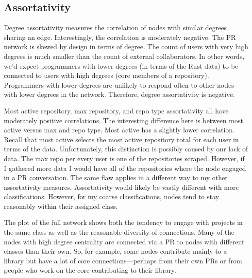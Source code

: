 \documentclass[12pt, a4paper]{article}
\begin{document}
\subsection{Assortativity}
Degree assortativity measures the correlation of nodes with similar degrees sharing an edge. Interestingly, the correlation is moderately negative. The PR network is skewed by design in terms of degree. The count of users with very high degrees is much smaller than the count of external collaborators. In other words, we'd expect programmers with lower degrees (in terms of the Rust data) to be connected to users with high degrees (core members of a repository). Programmers with lower degrees are unlikely to respond often to other nodes with lower degrees in the network. Therefore, degree assortativity is negative.

Most active repository, max repository, and repo type assortativity all have moderately positive correlations. The interesting difference here is between most active versus max and repo type. Most active has a slightly lower correlation. Recall that most active selects the most active repository total for each user in terms of the data. Unfortunately, this distinction is possibly caused by our lack of data. The max repo per every user is one of the repositories scraped. However, if I gathered more data I would have all of the repositories where the node engaged in a PR conversation. The same flaw applies in a different way to my other assortativity measures. Assortativity would likely be vastly different with more classifications. However, for my coarse classifications, nodes tend to stay reasonably within their assigned class.

The plot of the full network shows both the tendency to engage with projects in the same class as well as the reasonable diversity of connections. Many of the nodes with high degree centrality are connected via a PR to nodes with different classes than their own. So, for example, some nodes contribute mainly to a library but have a lot of core connections---perhaps from their own PRs or from people who work on the core contributing to their library.
\end{document}
